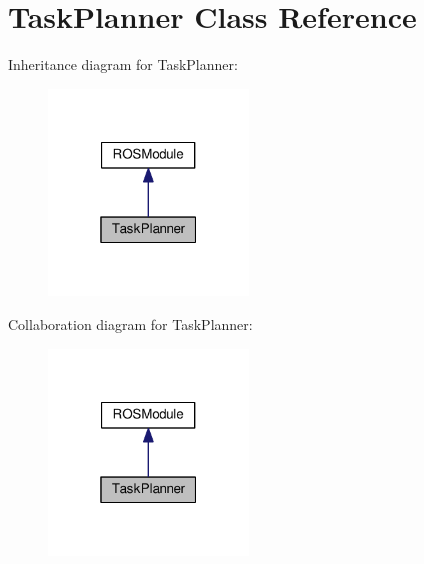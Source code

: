 \hypertarget{classTaskPlanner}{}\section{Task\+Planner Class Reference}
\label{classTaskPlanner}


Inheritance diagram for Task\+Planner\+:
\nopagebreak
\begin{figure}[H]
\begin{center}
\leavevmode
\includegraphics[width=151pt]{classTaskPlanner__inherit__graph}
\end{center}
\end{figure}


Collaboration diagram for Task\+Planner\+:
\nopagebreak
\begin{figure}[H]
\begin{center}
\leavevmode
\includegraphics[width=151pt]{classTaskPlanner__coll__graph}
\end{center}
\end{figure}
